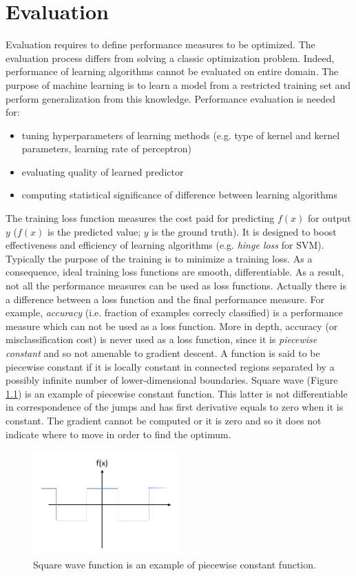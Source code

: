 \chapter{Evaluation}
\label{cha:evaluation}
Evaluation requires to define performance measures to be optimized. The evaluation process differs from solving a classic optimization problem. Indeed, performance of learning algorithms cannot be evaluated on entire domain. The purpose of machine learning is to learn a model from a restricted training set and perform generalization from this knowledge. Performance evaluation is needed for:
\begin{itemize}
    \item tuning hyperparameters of learning methods (e.g. type of kernel and kernel parameters, learning rate of perceptron)
    \item evaluating quality of learned predictor
    \item computing statistical significance of difference between learning algorithms
\end{itemize}

The training loss function measures the cost paid for predicting $f(x)$ for output $y$ ($f(x)$ is the predicted value; $y$ is the ground truth). It is designed to boost effectiveness and efficiency of learning algorithms (e.g. \textit{hinge loss} for SVM). Typically the purpose of the training is to minimize a training loss. As a consequence, ideal training loss functions are smooth, differentiable. As a result, not all the performance measures can be used as loss functions. Actually there is a difference between a loss function and the final performance measure. For example, \textit{accuracy} (i.e. fraction of examples correcly classified) is a performance measure which can not be used as a loss function. More in depth, accuracy (or misclassification cost) is never used as a loss function, since it is \textit{piecewise constant} and so not amenable to gradient descent. A function is said to be piecewise constant if it is locally constant in connected regions separated by a possibly infinite number of lower-dimensional boundaries. Square wave (Figure \ref{fig:square_wave}) is an example of piecewise constant function. This latter is not differentiable in correspondence of the jumps and has first derivative equals to zero when it is constant. The gradient cannot be computed or it is zero and so it does not indicate where to move in order to find the optimum. 

\begin{figure}
    \centering
    \includegraphics[width=0.5\textwidth]{images/square-wave-function.png}
    \caption{Square wave function is an example of piecewise constant function.}
    \label{fig:square_wave}
\end{figure}

